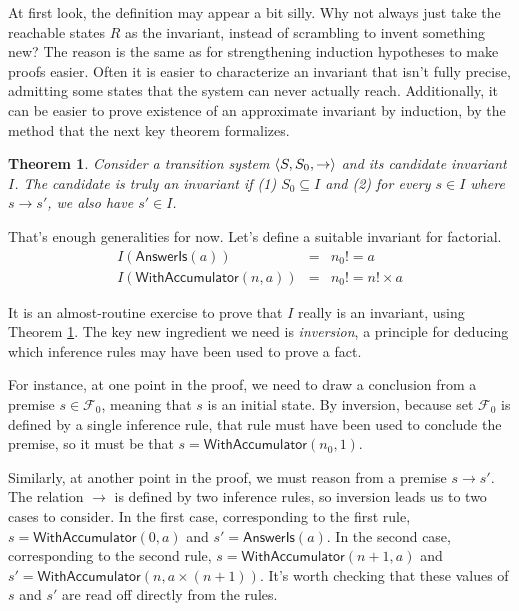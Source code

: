 \documentclass{amsbook}
\newtheorem{theorem}{Theorem}[chapter]
\theoremstyle{definition}
\theoremstyle{remark}
\numberwithin{section}{chapter}
\numberwithin{equation}{chapter}
\begin{document}
At first look, the definition may appear a bit silly.
Why not always just take the reachable states $R$ as the invariant, instead of scrambling to invent something new?
The reason is the same as for strengthening induction hypotheses to make proofs easier.
Often it is easier to characterize an invariant that isn't fully precise, admitting some states that the system can never actually reach.
Additionally, it can be easier to prove existence of an approximate invariant by induction, by the method that the next key theorem formalizes.

\begin{theorem}\label{invariant_induction}
  Consider a transition system ${\left \langle S, S_0, \to \right \rangle}$ and its candidate invariant $I$.  The candidate is truly an invariant if (1) $S_0 \subseteq I$ and (2) for every $s \in I$ where $s \to s'$, we also have $s' \in I$.
\end{theorem}

That's enough generalities for now.
Let's define a suitable invariant for factorial.
\invariants
\begin{eqnarray*}
  I(\mathsf{AnswerIs}(a)) &=& n_0! = a \\
  I(\mathsf{WithAccumulator}(n, a)) &=& n_0! = n! \times a
\end{eqnarray*}

It is an almost-routine exercise to prove that $I$ really is an invariant, using Theorem \ref{invariant_induction}.
The key new ingredient we need is \emph{inversion}, a principle for deducing which inference rules may have been used to prove a fact.

For instance, at one point in the proof, we need to draw a conclusion from a premise $s \in \mathcal F_0$, meaning that $s$ is an initial state.
By inversion, because set $\mathcal F_0$ is defined by a single inference rule, that rule must have been used to conclude the premise, so it must be that $s = \mathsf{WithAccumulator}(n_0, 1)$.

Similarly, at another point in the proof, we must reason from a premise $s \to s'$.
The relation $\to$ is defined by two inference rules, so inversion leads us to two cases to consider.
In the first case, corresponding to the first rule, $s = \mathsf{WithAccumulator}(0, a)$ and $s' = \mathsf{AnswerIs}(a)$.
In the second case, corresponding to the second rule, $s = \mathsf{WithAccumulator}(n+1, a)$ and $s' = \mathsf{WithAccumulator}(n, a \times (n+1))$.
It's worth checking that these values of $s$ and $s'$ are read off directly from the rules.
\end{document}
